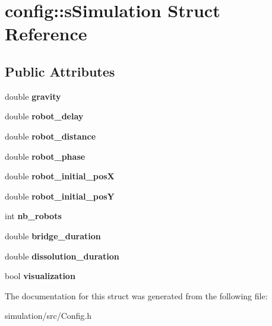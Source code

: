 \hypertarget{structconfig_1_1s_simulation}{}\section{config\+:\+:s\+Simulation Struct Reference}
\label{structconfig_1_1s_simulation}
\subsection*{Public Attributes}
\begin{DoxyCompactItemize}
\item 
\mbox{\label{structconfig_1_1s_simulation_a25ccff214dabfb1a6f711f8350ae8871}} 
double {\bfseries gravity}
\item 
\mbox{\label{structconfig_1_1s_simulation_a967cb0f1917b6a79271401bf64978533}} 
double {\bfseries robot\+\_\+delay}
\item 
\mbox{\label{structconfig_1_1s_simulation_a9a76eabe85007447b4ffc3cf80499661}} 
double {\bfseries robot\+\_\+distance}
\item 
\mbox{\label{structconfig_1_1s_simulation_a162430ba1e14142b5e17c46607473a5d}} 
double {\bfseries robot\+\_\+phase}
\item 
\mbox{\label{structconfig_1_1s_simulation_a79abcea43cc4f6b0288b89ef25cc0001}} 
double {\bfseries robot\+\_\+initial\+\_\+posX}
\item 
\mbox{\label{structconfig_1_1s_simulation_a5f210266729c02d90c6434407c520a46}} 
double {\bfseries robot\+\_\+initial\+\_\+posY}
\item 
\mbox{\label{structconfig_1_1s_simulation_a2c1ada081a51c0fe22a0a792e86b2a7d}} 
int {\bfseries nb\+\_\+robots}
\item 
\mbox{\label{structconfig_1_1s_simulation_aff5f4baa8b4f27a11ddb1ca2dae35aee}} 
double {\bfseries bridge\+\_\+duration}
\item 
\mbox{\label{structconfig_1_1s_simulation_ad8704f9eb529596937a9ab05f776f8ea}} 
double {\bfseries dissolution\+\_\+duration}
\item 
\mbox{\label{structconfig_1_1s_simulation_a4e43c8d5ae20bd2e8bd9b3465a974de7}} 
bool {\bfseries visualization}
\end{DoxyCompactItemize}


The documentation for this struct was generated from the following file\+:\begin{DoxyCompactItemize}
\item 
simulation/src/Config.\+h\end{DoxyCompactItemize}
